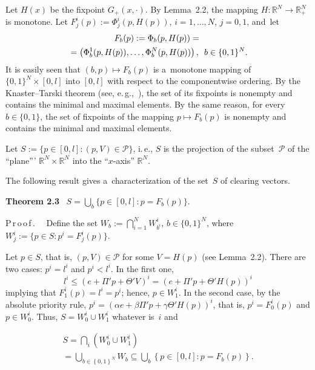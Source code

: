 \begin{multicols}{2}
Let  $H(x)$ be the fixpoint $G_+(x, \cdot)$. By  Lemma~2.2, the mapping $H: \mathbb{R}^N \to \mathbb{R}^N_+$ is monotone.
Let $F^i_j(p) := \Phi^i_j(p, H(p))$, $i=1,\dots, N$,   $j=0,1$, and~let  
\begin{multline*}
F_b(p) := \Phi_b(p, H(p))={}\\
{}=\left( \Phi^1_b(p, H(p)),\dots,  \Phi^N_b(p, H(p))\right), \enskip b\in \{0,1\}^N.  
\end{multline*}
It is easily seen that  $(b,p)\mapsto F_b(p)$ is a~monotone mapping of 
$\{0,1\}^N\times [0,l]$ into $[0,l]$ with respect to the componentwise ordering.
By the Knaster--Tarski theorem (see, e.\,g.,~\cite{kabanov2018clearing}), the set of its fixpoints is
 nonempty and contains the minimal and maximal elements. By the same reason, for every $b\in \{0,1\}$, 
 the set of  fixpoints of the mapping $p\mapsto F_b(p)$ is nonempty and contains the minimal and maximal elements.
\smallskip

Let  $S:=\{p \in [0, l]\colon (p,V)\in \mathcal{P}\}$, i.\,e., $S$ is the projection of the subset~$\mathcal{P}$ of the ``plane''' 
$\mathbb{R}^N\times \mathbb{R}^N$ into the ``$x$-axis'' $\mathbb{R}^N$. 

The following  result gives a~characterization of the set~$S$ of  clearing vectors. 

\smallskip

\noindent
\textbf{Theorem 2.3}\ %
 $S=\bigcup_b\{p \in [0, l]\colon p=F_b(p)\}$.

\noindent
P\,r\,o\,o\,f\,.\ \
\smallskip
Define the set $
 W_b := \bigcap_{i=1}^{N} W^i_{b^i}$, $b \in \{0, 1\}^N$, where  $W^i_j := \{ p \in S \colon p^i = F^i_j (p)\}$. 
 
 Let $p\in S$, that is, $(p,V) \in \mathcal{P}$ for some $V=H(p)$  (see Lemma~2.2). There are two cases:  $p^i = l^i$ and $p^i < l^i$. In the first one, 
 $$
 l^i \le \left(e + \Pi' p + \Theta' V\right)^i=\left(e + \Pi' p + \Theta' H(p)\right)^i
 $$
implying that $F^i_1 (p)=l^i=p^i$; hence, $p \in W^i_1$.
In the second case,   by the absolute  priority rule, 
$p^i = (\alpha e + \beta \Pi' p + \gamma \Theta' H(p))^i$, that is, $p^i = F^i_0(p)$ and $p \in W^i_0$. Thus, 
 $S = W^i_0 \cup W^i_1$ whatever is~$i$ and  
 
 \vspace*{-4pt}
 
 \noindent
\begin{multline*}
 S=\bigcap_i \left(W^i_0 \cup W^i_1\right)\\
 {}=\bigcup_{b \in \left\{0, 1\right\}^N}  W_b\subseteq   \bigcup_b\left\{p \in [0, l]\colon p=F_b(p)\right\} .
\end{multline*}


\end{multicols}
